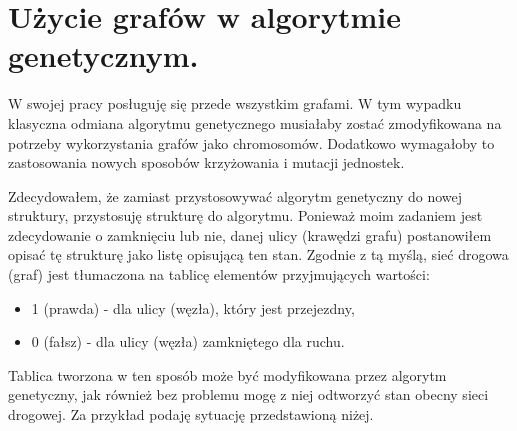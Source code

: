 \documentclass[twoside,12pt]{report}
\begin{document}
\section{Użycie grafów w algorytmie genetycznym.}

W swojej pracy posługuję się przede wszystkim grafami. W tym wypadku klasyczna odmiana algorytmu genetycznego musiałaby zostać zmodyfikowana na potrzeby wykorzystania grafów jako chromosomów. Dodatkowo wymagałoby to zastosowania nowych sposobów krzyżowania i mutacji jednostek. 

Zdecydowałem, że zamiast przystosowywać algorytm genetyczny do nowej struktury, przystosuję strukturę do algorytmu. Ponieważ moim zadaniem jest zdecydowanie o zamknięciu lub nie, danej ulicy (krawędzi grafu) postanowiłem opisać tę strukturę jako listę opisującą ten stan. Zgodnie z tą myślą, sieć drogowa (graf) jest tłumaczona na tablicę elementów przyjmujących wartości:

\begin{itemize}
\item 1 (prawda) - dla ulicy (węzła), który jest przejezdny,
\item 0 (fałsz) - dla ulicy (węzła) zamkniętego dla ruchu.
\end{itemize}

Tablica tworzona w ten sposób może być modyfikowana przez algorytm genetyczny, jak również bez problemu mogę z niej odtworzyć stan obecny sieci drogowej. Za przykład podaję sytuację przedstawioną niżej.
\end{document}

